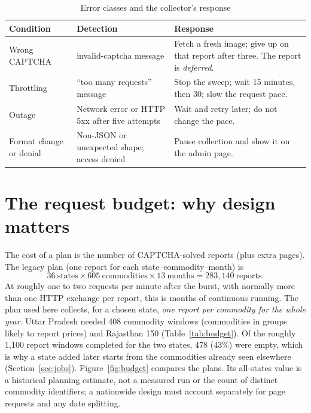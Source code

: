 \documentclass[12pt,a4paper,oneside]{report}
\numberwithin{equation}{chapter}
\numberwithin{figure}{chapter}
\numberwithin{table}{chapter}
\theoremstyle{definition}
\begin{document}
\begin{table}[H]
\centering
\caption{Error classes and the collector's response}
\label{tab:errors}
\small
\begin{tabular}{@{}p{}p{}p{}@{}}
\toprule
Condition & Detection & Response \\
\midrule
Wrong CAPTCHA & invalid-captcha message & Fetch a fresh image; give up on that report after three. The report is \emph{deferred}. \\
Throttling & ``too many requests'' message & Stop the sweep; wait 15 minutes, then 30; slow the request pace. \\
Outage & Network error or HTTP 5xx after five attempts & Wait and retry later; do not change the pace. \\
Format change or denial & Non-JSON or unexpected shape; access denied & Pause collection and show it on the admin page. \\
\bottomrule
\end{tabular}
\end{table}

\section{The request budget: why design matters}
The cost of a plan is the number of CAPTCHA-solved reports (plus extra pages). The legacy plan (one report for each state--commodity--month) is
\[
  36\ \text{states}\times 605\ \text{commodities}\times 13\ \text{months}=283{,}140\ \text{reports}.
\]
At roughly one to two requests per minute after the burst, with normally more than one HTTP exchange per report, this is months of continuous running. The plan used here collects, for a chosen state, \emph{one report per commodity for the whole year}. Uttar Pradesh needed 408 commodity windows (commodities in groups likely to report prices) and Rajasthan 150 (Table~\ref{tab:budget}). Of the roughly 1,100 report windows completed for the two states, 478 (43\%) were empty, which is why a state added later starts from the commodities already seen elsewhere (Section~\ref{sec:jobs}). Figure~\ref{fig:budget} compares the plans. Its all-states value is a historical planning estimate, not a measured run or the count of distinct commodity identifiers; a nationwide design must account separately for page requests and any date splitting.
\end{document}
